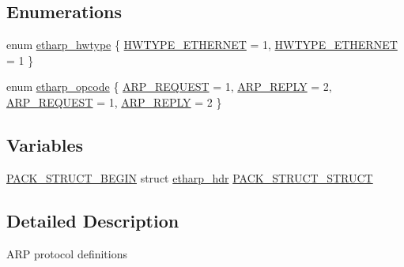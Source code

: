 \subsection*{Enumerations}
\begin{DoxyCompactItemize}
\item 
enum \hyperlink{openmote-cc2538_2lwip_2src_2include_2lwip_2prot_2etharp_8h_a2bfef84e6dba235e7019834a4b493a66}{etharp\+\_\+hwtype} \{ \hyperlink{native_2lwip_2src_2include_2lwip_2prot_2etharp_8h_a2bfef84e6dba235e7019834a4b493a66a6e4adc4f5f733878a0173c6fb98a5f93}{H\+W\+T\+Y\+P\+E\+\_\+\+E\+T\+H\+E\+R\+N\+ET} = 1, 
\hyperlink{openmote-cc2538_2lwip_2src_2include_2lwip_2prot_2etharp_8h_a2bfef84e6dba235e7019834a4b493a66a6e4adc4f5f733878a0173c6fb98a5f93}{H\+W\+T\+Y\+P\+E\+\_\+\+E\+T\+H\+E\+R\+N\+ET} = 1
 \}
\item 
enum \hyperlink{openmote-cc2538_2lwip_2src_2include_2lwip_2prot_2etharp_8h_af8a1068cba34f11d56afb73cdd879cab}{etharp\+\_\+opcode} \{ \hyperlink{native_2lwip_2src_2include_2lwip_2prot_2etharp_8h_af8a1068cba34f11d56afb73cdd879cabafb58ccf8b7b11505ff2117a10bf6ff61}{A\+R\+P\+\_\+\+R\+E\+Q\+U\+E\+ST} = 1, 
\hyperlink{native_2lwip_2src_2include_2lwip_2prot_2etharp_8h_af8a1068cba34f11d56afb73cdd879caba8bb24a026264a5b22435864179f874d9}{A\+R\+P\+\_\+\+R\+E\+P\+LY} = 2, 
\hyperlink{openmote-cc2538_2lwip_2src_2include_2lwip_2prot_2etharp_8h_af8a1068cba34f11d56afb73cdd879cabafb58ccf8b7b11505ff2117a10bf6ff61}{A\+R\+P\+\_\+\+R\+E\+Q\+U\+E\+ST} = 1, 
\hyperlink{openmote-cc2538_2lwip_2src_2include_2lwip_2prot_2etharp_8h_af8a1068cba34f11d56afb73cdd879caba8bb24a026264a5b22435864179f874d9}{A\+R\+P\+\_\+\+R\+E\+P\+LY} = 2
 \}
\end{DoxyCompactItemize}
\subsection*{Variables}
\begin{DoxyCompactItemize}
\item 
\hyperlink{group__compiler__abstraction_ga73199061891adf1b912d20835c7d5e96}{P\+A\+C\+K\+\_\+\+S\+T\+R\+U\+C\+T\+\_\+\+B\+E\+G\+IN} struct \hyperlink{structetharp__hdr}{etharp\+\_\+hdr} \hyperlink{openmote-cc2538_2lwip_2src_2include_2lwip_2prot_2etharp_8h_aaed02b358523d34386452b27c49cd492}{P\+A\+C\+K\+\_\+\+S\+T\+R\+U\+C\+T\+\_\+\+S\+T\+R\+U\+CT}
\end{DoxyCompactItemize}


\subsection{Detailed Description}
A\+RP protocol definitions 

